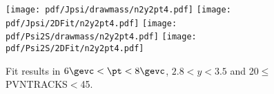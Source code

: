 \begin{figure}[H]
\begin{center}
\texttt{[image: pdf/Jpsi/drawmass/n2y2pt4.pdf]}
\texttt{[image: pdf/Jpsi/2DFit/n2y2pt4.pdf]}
\vspace*{-0.5cm}
\texttt{[image: pdf/Psi2S/drawmass/n2y2pt4.pdf]}
\texttt{[image: pdf/Psi2S/2DFit/n2y2pt4.pdf]}
\vspace*{-0.5cm}
\end{center}
\caption{Fit results in $6\gevc<\pt<8\gevc$, $2.8<y<3.5$ and 20$\leq$PVNTRACKS$<$45.}
\label{Fitn2y2pt4}
\end{figure}
